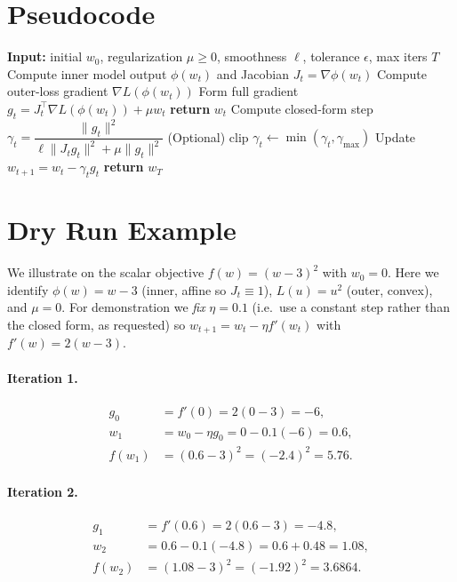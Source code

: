 \documentclass[11pt]{article}
\begin{document}
\section*{Pseudocode}

\begin{algorithm}[H]
\caption{Deep Frank-Wolfe (DFW) with closed-form step}
\begin{algorithmic}[1]
\State \textbf{Input:} initial $w_0$, regularization $\mu \ge 0$, smoothness $\ell$, tolerance $\epsilon$, max iters $T$
  \State Compute inner model output $\phi(w_t)$ and Jacobian $J_t = \nabla\phi(w_t)$
  \State Compute outer-loss gradient $\nabla L(\phi(w_t))$
  \State Form full gradient $g_t = J_t^\top \nabla L(\phi(w_t)) + \mu w_t$
   \State \textbf{return} $w_t$ \EndIf
  \State Compute closed-form step
         $\gamma_t = \dfrac{\|g_t\|^2}{\ell\|J_t g_t\|^2 + \mu\|g_t\|^2}$
  \State (Optional) clip $\gamma_t \gets \min(\gamma_t,\gamma_{\max})$
  \State Update $w_{t+1} = w_t - \gamma_t g_t$
\EndFor
\State \textbf{return} $w_T$
\end{algorithmic}
\end{algorithm}

\section*{Dry Run Example}

We illustrate on the scalar objective $f(w) = (w-3)^2$ with $w_0 = 0$.
Here we identify $\phi(w) = w-3$ (inner, affine so $J_t \equiv 1$),
$L(u) = u^2$ (outer, convex), and $\mu = 0$. For demonstration we
\emph{fix} $\eta = 0.1$ (i.e.\ use a constant step rather than the closed
form, as requested) so $w_{t+1} = w_t - \eta f'(w_t)$ with
$f'(w) = 2(w-3)$.

\paragraph{Iteration 1.}
\begin{align*}
g_0 &= f'(0) = 2(0-3) = -6,\\
w_1 &= w_0 - \eta g_0 = 0 - 0.1(-6) = 0.6,\\
f(w_1) &= (0.6-3)^2 = (-2.4)^2 = 5.76.
\end{align*}

\paragraph{Iteration 2.}
\begin{align*}
g_1 &= f'(0.6) = 2(0.6-3) = -4.8,\\
w_2 &= 0.6 - 0.1(-4.8) = 0.6 + 0.48 = 1.08,\\
f(w_2) &= (1.08-3)^2 = (-1.92)^2 = 3.6864.
\end{align*}
\end{document}
